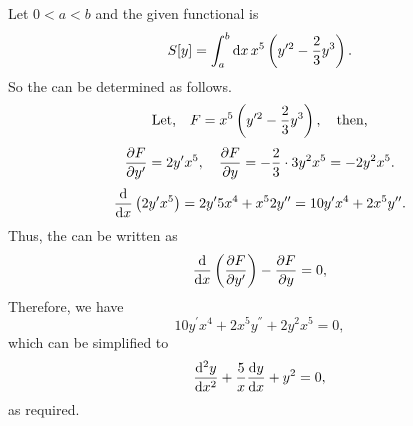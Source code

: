\def\yp2{y^{\prime2}}%
\def\2o3{\frac{2}{3}}%
Let $0 < a < b$ and the given functional is
\[
	S[y] = \Int{a}{b}{x} x^5 \lr{\yp2 - \2o3y^3}.
\]
So the \el can be determined as follows.
\[
	\textrm{Let,}\quad F = x^5 \lr{\yp2 - \2o3y^3}, \quad\textrm{then,}
\]
\[
	\pderiv{F}{y^\prime} = 2y^\prime x^5,\quad \pderiv{F}{y} = -\2o3\cdot3y^2x^5 = -2y^2x^5.
\]
\[
	\deriv{}{x}\lr{2y^\prime x^5} = 2y^\prime5x^4 + x^52y^\dprime = 10y^\prime x^4 + 2x^5y^\dprime.
\]
Thus, the \el can be written as
\[
	\ELE{F}{x}{y},
\]
Therefore, we have
\[
	10y^\prime x^4 + 2x^5y^\dprime + 2y^2x^5 = 0,
\]
which can be simplified to
\[
	\deriv{^2y}{x^2} + \frac{5}{x}\deriv{y}{x} + y^2 = 0,
\]
as required.